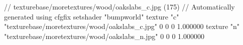 // texturebase/moretextures/wood/oakslabs_c.jpg (175)
// Automatically generated using cfgfix
setshader "bumpworld"
texture "c" "texturebase/moretextures/wood/oakslabs_c.jpg" 0 0 0 1.000000
texture "n" "texturebase/moretextures/wood/oakslabs_n.jpg" 0 0 0 1.000000
